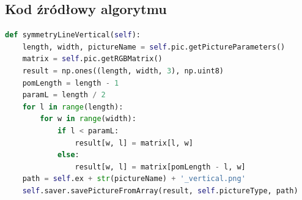 \documentclass[a4paper,12pt, titlepage]{report}
\begin{document}
\subsection*{Kod źródłowy algorytmu}
\begin{lstlisting}[language=Python]
def symmetryLineVertical(self):
    length, width, pictureName = self.pic.getPictureParameters()
    matrix = self.pic.getRGBMatrix()
    result = np.ones((length, width, 3), np.uint8)
    pomLength = length - 1
    paramL = length / 2
    for l in range(length):
        for w in range(width):
            if l < paramL:
                result[w, l] = matrix[l, w]
            else:
                result[w, l] = matrix[pomLength - l, w]
    path = self.ex + str(pictureName) + '_vertical.png'
    self.saver.savePictureFromArray(result, self.pictureType, path)
\end{lstlisting}
\end{document}
